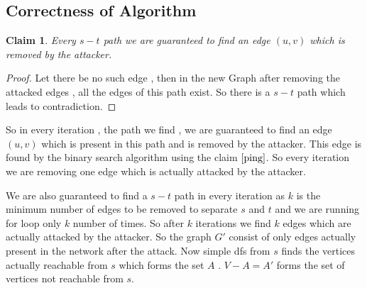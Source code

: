 \documentclass[11pt]{article}
\newtheorem{claim}[theorem]{Claim}
\begin{document}
\subsection*{Correctness of Algorithm}
\begin{claim}
Every $s-t$ path we are guaranteed to find an edge $(u,v)$ which is removed by the attacker.
\end{claim}
\begin{proof}
Let there be no such edge , then in the new Graph after removing the attacked edges , all the edges of this path exist. So there is a $s-t$ path which leads to contradiction. 
\end{proof}

So in every iteration , the path we find , we are guaranteed to find an edge $(u,v)$ which is present in this path and is removed by the attacker. This edge is found by the binary search algorithm using the claim $\ref{ping}$. So every iteration we are removing one edge which is actually attacked by the attacker. 

We are also guaranteed to find a $s-t$ path in every iteration as $k$ is the minimum number of edges to be removed to separate $s$ and $t$ and we are running for loop only $k$ number of times. So after $k$ iterations we find $k$ edges which are actually attacked by the attacker. So the graph $G'$ consist of only edges actually present in the network after the attack. Now simple dfs from $s$ finds the vertices actually reachable from $s$ which forms the set $A$ . $V-A=A'$ forms the set of vertices not reachable from $s$.
\end{document}
